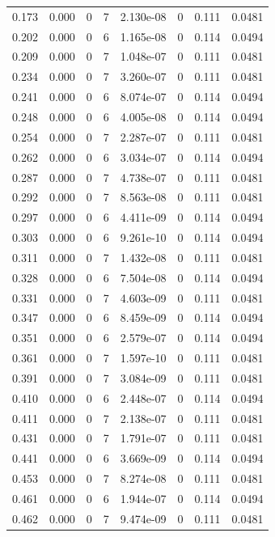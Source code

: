 \documentclass[preview]{standalone}
\begin{document}
{{\begin{tabular}{L{1.2cm}C{1.2cm} C{0.3cm}C{0.5cm} C{1.4cm}C{1.4cm} C{1.4cm}C{1.4cm}}
  0.173  &  0.000  & 0     &  7 &  2.130e-08  & 0  & 0.111 &  0.0481   \\ 
  0.202  &  0.000  & 0     &  6 &  1.165e-08  & 0  & 0.114 &  0.0494   \\ 
  0.209  &  0.000  & 0     &  7 &  1.048e-07  & 0  & 0.111 &  0.0481   \\ 
  0.234  &  0.000  & 0     &  7 &  3.260e-07  & 0  & 0.111 &  0.0481   \\ 
  0.241  &  0.000  & 0     &  6 &  8.074e-07  & 0  & 0.114 &  0.0494   \\ 
  0.248  &  0.000  & 0     &  6 &  4.005e-08  & 0  & 0.114 &  0.0494   \\ 
  0.254  &  0.000  & 0     &  7 &  2.287e-07  & 0  & 0.111 &  0.0481   \\ 
  0.262  &  0.000  & 0     &  6 &  3.034e-07  & 0  & 0.114 &  0.0494   \\ 
  0.287  &  0.000  & 0     &  7 &  4.738e-07  & 0  & 0.111 &  0.0481   \\ 
  0.292  &  0.000  & 0     &  7 &  8.563e-08  & 0  & 0.111 &  0.0481   \\ 
  0.297  &  0.000  & 0     &  6 &  4.411e-09  & 0  & 0.114 &  0.0494   \\ 
  0.303  &  0.000  & 0     &  6 &  9.261e-10  & 0  & 0.114 &  0.0494   \\ 
  0.311  &  0.000  & 0     &  7 &  1.432e-08  & 0  & 0.111 &  0.0481   \\ 
  0.328  &  0.000  & 0     &  6 &  7.504e-08  & 0  & 0.114 &  0.0494   \\ 
  0.331  &  0.000  & 0     &  7 &  4.603e-09  & 0  & 0.111 &  0.0481   \\ 
  0.347  &  0.000  & 0     &  6 &  8.459e-09  & 0  & 0.114 &  0.0494   \\ 
  0.351  &  0.000  & 0     &  6 &  2.579e-07  & 0  & 0.114 &  0.0494   \\ 
  0.361  &  0.000  & 0     &  7 &  1.597e-10  & 0  & 0.111 &  0.0481   \\ 
  0.391  &  0.000  & 0     &  7 &  3.084e-09  & 0  & 0.111 &  0.0481   \\ 
  0.410  &  0.000  & 0     &  6 &  2.448e-07  & 0  & 0.114 &  0.0494   \\ 
  0.411  &  0.000  & 0     &  7 &  2.138e-07  & 0  & 0.111 &  0.0481   \\ 
  0.431  &  0.000  & 0     &  7 &  1.791e-07  & 0  & 0.111 &  0.0481   \\ 
  0.441  &  0.000  & 0     &  6 &  3.669e-09  & 0  & 0.114 &  0.0494   \\ 
  0.453  &  0.000  & 0     &  7 &  8.274e-08  & 0  & 0.111 &  0.0481   \\ 
  0.461  &  0.000  & 0     &  6 &  1.944e-07  & 0  & 0.114 &  0.0494   \\ 
  0.462  &  0.000  & 0     &  7 &  9.474e-09  & 0  & 0.111 &  0.0481   \\ 
\hline 
\end{tabular} 

}}
\end{document}

